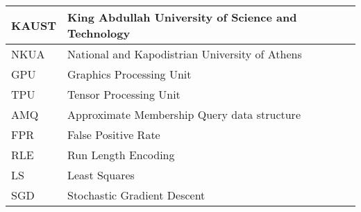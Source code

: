 \documentclass[preface]{dithesis}
\begin{document}
\frontmatter
\mainmatter


\newpage



% 












\backmatter

\abbreviations
\begin{center}
	\begin{tabularx}{\textwidth}{|p{3cm}|p{12.615cm}|}
	\hline
	KAUST & King Abdullah University of Science and Technology \\  \hline
	NKUA    & National and Kapodistrian University of Athens\\  \hline
	GPU    & Graphics Processing Unit \\  \hline
	TPU    & Tensor Processing Unit \\  \hline
	AMQ    & Approximate Membership Query data structure \\  \hline
	FPR    & False Positive Rate \\  \hline
	RLE    & Run Length Encoding \\  \hline
	LS     & Least Squares \\  \hline
	SGD    & Stochastic Gradient Descent \\
	\hline
	\end{tabularx}
\end{center}
\end{document}
